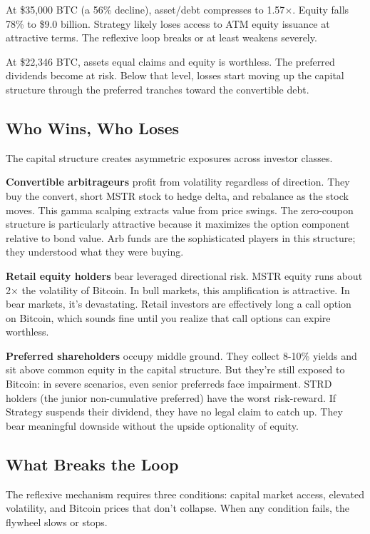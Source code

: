 At \$35,000 BTC (a 56\% decline), asset/debt compresses to 1.57$\times$. Equity falls 78\% to \$9.0 billion. Strategy likely loses access to ATM equity issuance at attractive terms. The reflexive loop breaks or at least weakens severely.

At \$22,346 BTC, assets equal claims and equity is worthless. The preferred dividends become at risk. Below that level, losses start moving up the capital structure through the preferred tranches toward the convertible debt.

\subsection{Who Wins, Who Loses}

The capital structure creates asymmetric exposures across investor classes.

\textbf{Convertible arbitrageurs} profit from volatility regardless of direction. They buy the convert, short MSTR stock to hedge delta, and rebalance as the stock moves. This gamma scalping extracts value from price swings. The zero-coupon structure is particularly attractive because it maximizes the option component relative to bond value. Arb funds are the sophisticated players in this structure; they understood what they were buying.

\textbf{Retail equity holders} bear leveraged directional risk. MSTR equity runs about 2$\times$ the volatility of Bitcoin. In bull markets, this amplification is attractive. In bear markets, it's devastating. Retail investors are effectively long a call option on Bitcoin, which sounds fine until you realize that call options can expire worthless.

\textbf{Preferred shareholders} occupy middle ground. They collect 8-10\% yields and sit above common equity in the capital structure. But they're still exposed to Bitcoin: in severe scenarios, even senior preferreds face impairment. STRD holders (the junior non-cumulative preferred) have the worst risk-reward. If Strategy suspends their dividend, they have no legal claim to catch up. They bear meaningful downside without the upside optionality of equity.

\subsection{What Breaks the Loop}

The reflexive mechanism requires three conditions: capital market access, elevated volatility, and Bitcoin prices that don't collapse. When any condition fails, the flywheel slows or stops.

